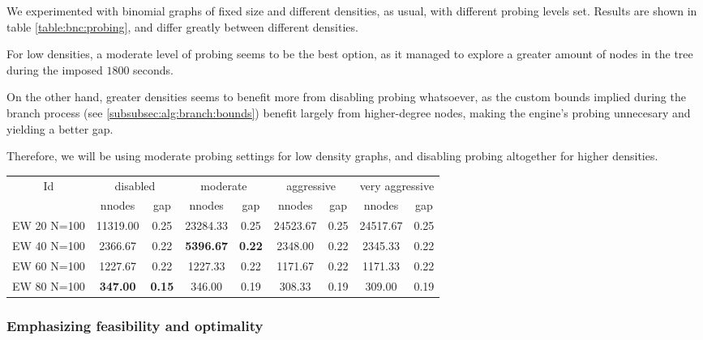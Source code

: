 We experimented with binomial graphs of fixed size and different densities, as usual, with different probing levels set. Results are shown in table \ref{table:bnc:probing}, and differ greatly between different densities.

For low densities, a moderate level of probing seems to be the best option, as it managed to explore a greater amount of nodes in the tree during the imposed $1800$ seconds. 

On the other hand, greater densities seems to benefit more from disabling probing whatsoever, as the custom bounds implied during the branch process (see \ref{subsubsec:alg:branch:bounds}) benefit largely from higher-degree nodes, making the engine's probing unnecesary and yielding a better gap.

Therefore, we will be using moderate probing settings for low density graphs, and disabling probing altogether for higher densities.

\begin{sidewaystable}[h]
\label{table:bnc:probing}
\centering

\begin{tabular}{|c|cc|cc|cc|cc|}
\hline
\multicolumn{1}{|c|}{Id} & \multicolumn{2}{|c|}{disabled} & \multicolumn{2}{|c|}{moderate} & \multicolumn{2}{|c|}{aggressive} & \multicolumn{2}{|c|}{very aggressive}
\\
 & nnodes & gap & nnodes & gap & nnodes & gap & nnodes & gap
\\
\hline
EW 20 N=100 & 11319.00 & 0.25 & 23284.33 & 0.25 & 24523.67 & 0.25 & 24517.67 & 0.25
\\
EW 40 N=100 & 2366.67 & 0.22 & \textbf{5396.67} & \textbf{0.22} & 2348.00 & 0.22 & 2345.33 & 0.22
\\
EW 60 N=100 & 1227.67 & 0.22 & 1227.33 & 0.22 & 1171.67 & 0.22 & 1171.33 & 0.22
\\
EW 80 N=100 & \textbf{347.00} & \textbf{0.15} & 346.00 & 0.19 & 308.33 & 0.19 & 309.00 & 0.19
\\
\hline 
 \end{tabular}
 
\caption{Average number of nodes in the tree and resulting gap, for different MIP probing levels.}

\end{sidewaystable}

\subsubsection{Emphasizing feasibility and optimality}

